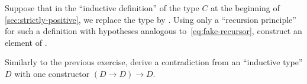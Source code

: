 \begin{ex}\label{ex:loop}
  Suppose that in the ``inductive definition'' of the type $C$ at the beginning of \autoref{sec:strictly-positive}, we replace the type \nat by \emptyt.
  Using only a ``recursion principle'' for such a definition with hypotheses analogous to~\eqref{eq:fake-recursor}, construct an element of \emptyt.
\end{ex}

\begin{ex}\label{ex:loop2}
  Similarly to the previous exercise, derive a contradiction from an ``inductive type'' $D$ with one constructor $(D\to D) \to D$.
\end{ex}


